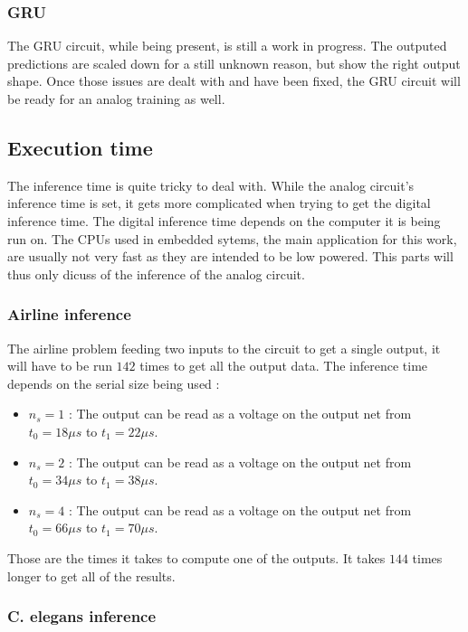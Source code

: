 \subsubsection{\ac{GRU}}

The \ac{GRU} circuit, while being present, is still a work in progress. The outputed predictions are scaled down for a still unknown reason, but show the right output shape. Once those issues are dealt with and have been fixed, the \ac{GRU} circuit will be ready for an analog training as well.

\subsection{Execution time}

The inference time is quite tricky to deal with. While the analog circuit's inference time is set, it gets more complicated when trying to get the digital inference time. The digital inference time depends on the computer it is being run on. The \acp{CPU} used in embedded sytems, the main application for this work, are usually not very fast as they are intended to be low powered. This parts will thus only dicuss of the inference of the analog circuit.

\subsubsection{Airline inference}

The airline problem feeding two inputs to the circuit to get a single output, it will have to be run $142$ times to get all the output data.
The inference time depends on the serial size being used :

\begin{itemize}
  \item $n_s=1$ : The output can be read as a voltage on the output net from $t_0=18\mu s$ to $t_1=22\mu s$.
  \item $n_s=2$ : The output can be read as a voltage on the output net from $t_0=34\mu s$ to $t_1=38\mu s$.
  \item $n_s=4$ : The output can be read as a voltage on the output net from $t_0=66\mu s$ to $t_1=70\mu s$.
\end{itemize}

Those are the times it takes to compute one of the outputs. It takes $144$ times longer to get all of the results.

\subsubsection{\ac{C. elegans} inference}

